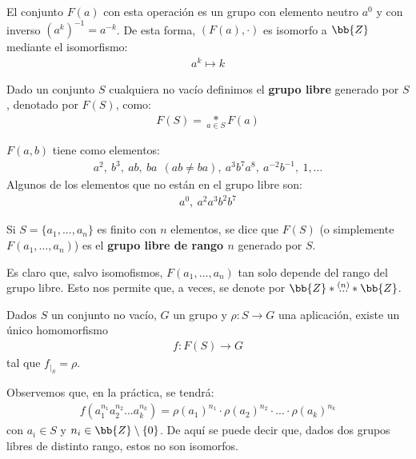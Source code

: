 El conjunto $F(a)$ con esta operación es un grupo con elemento neutro $a^0$ y con inverso $(a^k)^{-1}= a^{-k}$.
De esta forma, $(F(a), \cdot)$ es isomorfo a $\bb{Z}$ mediante el isomorfismo:
\begin{gather*}
    a^k \longmapsto k
\end{gather*}

\begin{definicion}
    Dado un conjunto $S$ cualquiera no vacío definimos el \textbf{grupo libre} generado por $S$, denotado por $F(S)$, como: 
    \begin{gather*}
        F(S)=\underset{a\in S}\ast F(a)
    \end{gather*}
\end{definicion}

\begin{ejemplo}
    $F(a,b)$ tiene como elementos:
    \begin{gather*}
        a^2,\ b^3,\ ab,\ ba\ \ (ab\neq ba) ,\ a^3b^7a^8,\ a^{-2}b^{-1},\ 1,...
    \end{gather*}
    Algunos de los elementos que no están en el grupo libre son:
    \begin{gather*}
        a^0,\ a^2a^3b^2b^7
    \end{gather*}
\end{ejemplo}

\begin{definicion}
    Si $S=\{a_1,...,a_n\}$ es finito con $n$ elementos, se dice que $F(S)$ (o simplemente $F(a_1,\dots, a_n)$) es el \textbf{grupo libre de rango $n$} generado por $S$.
\end{definicion}

Es claro que, salvo isomofismos, $F(a_1,\dots,a_n)$ tan solo depende del rango del grupo libre. Esto nos permite que, a veces, se denote por $\bb{Z}\ast \overset{(n)}{...} \ast \bb{Z}$.


\begin{coro}
    Dados $S$ un conjunto no vacío, $G$ un grupo y $\rho : S \to G$ una aplicación, existe un único homomorfismo 
    \begin{gather*}
        f:F(S) \to G
    \end{gather*}
    tal que $f_{|_S}=\rho$.
\end{coro}

Observemos que, en la práctica, se tendrá: 
\begin{gather*}
    f(a_1^{n_1}a_2^{n_2}...a_k^{n_k}) = \rho(a_1)^{n_1} \cdot \rho(a_2)^{n_2} \cdot ... \cdot \rho(a_k)^{n_k} 
\end{gather*}
con $a_i\in S$ y $n_i\in \bb{Z}\setminus\{0\}$. De aquí se puede decir que, dados dos grupos libres de distinto rango, estos no son isomorfos.

